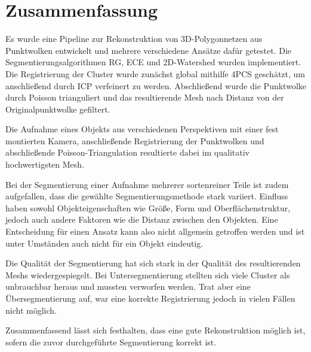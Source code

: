
\chapter{Zusammenfassung}
\label{ch:zusammenfassung}

Es wurde eine Pipeline zur Rekonstruktion von 3D-Polygonnetzen aus Punktwolken entwickelt und mehrere verschiedene Ansätze dafür getestet.
Die Segmentierungsalgorithmen \ac{RG}, \ac{ECE} und 2D-Watershed wurden implementiert.
Die Registrierung der Cluster wurde zunächst global mithilfe \ac{4PCS} geschätzt, um anschließend durch \ac{ICP} verfeinert zu werden.
Abschließend wurde die Punktwolke durch Poisson trianguliert und das resultierende Mesh nach Distanz von der Originalpunktwolke gefiltert.

Die Aufnahme eines Objekts aus verschiedenen Perspektiven mit einer fest montierten Kamera, anschließende Registrierung der Punktwolken und abschließende Poisson-Triangulation resultierte dabei im qualitativ hochwertigsten Mesh.

Bei der Segmentierung einer Aufnahme mehrerer sortenreiner Teile ist zudem aufgefallen, dass die gewählte Segmentierungsmethode stark variiert.
Einfluss haben sowohl Objekteigenschaften wie Größe, Form und Oberflächenstruktur, jedoch auch andere Faktoren wie die Distanz zwischen den Objekten.
Eine Entscheidung für einen Ansatz kann also nicht allgemein getroffen werden und ist unter Umständen auch nicht für ein Objekt eindeutig.

Die Qualität der Segmentierung hat sich stark in der Qualität des resultierenden Meshs wiedergespiegelt.
Bei Untersegmentierung stellten sich viele Cluster als unbrauchbar heraus und mussten verworfen werden.
Trat aber eine Übersegmentierung auf, war eine korrekte Registrierung jedoch in vielen Fällen nicht möglich.

Zusammenfassend lässt sich festhalten, dass eine gute Rekonstruktion möglich ist, sofern die zuvor durchgeführte Segmentierung korrekt ist.